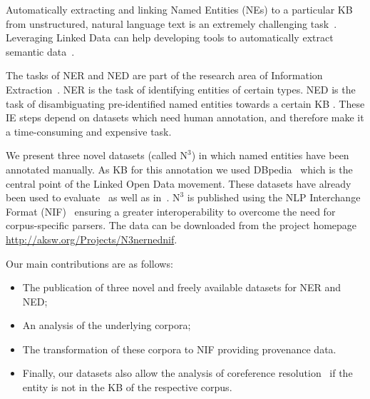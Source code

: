 

Automatically extracting and linking Named Entities (NEs) to a particular \ac{KB}  from unstructured, natural language text is an extremely challenging task~\cite{Cucerzan07}. 
Leveraging Linked Data can help developing tools to automatically extract semantic data~\cite{GER+13,AIDA,spotlight,agdistis_iswc}.

The tasks of \ac{NER}  and \ac{NED}  are part of the research area of Information Extraction~\cite{FOX}.
NER is the task of identifying entities of certain types.
NED is the task of disambiguating pre-identified named entities towards a certain \ac{KB} .
These IE steps depend on datasets which need human annotation, and therefore make it a time-consuming and expensive task.

We present three novel datasets (called $\mbox{N}^3$) in which named entities have been annotated manually. As \ac{KB}  for this annotation we used DBpedia~\cite{dbpedia-swj} which is the central point of the Linked Open Data movement. These datasets have already been used to evaluate~\cite{AIDA,spotlight} as well as in~\cite{GER+13,agdistis_iswc,GERBIL}.
$\mbox{N}^3$ is published using the \ac{NLP} Interchange Format (NIF)~\cite{ISWC2013NIF} ensuring a greater interoperability to overcome the need for corpus-specific parsers. 
The data can be downloaded from the project homepage \url{http://aksw.org/Projects/N3nernednif}.

Our main contributions are as follows:
\begin{itemize}
\item The publication of three novel and freely available datasets for \ac{NER} and \ac{NED};
\item An analysis of the underlying corpora;
\item The transformation of these corpora to NIF providing provenance data.
\item Finally, our datasets also allow the analysis of coreference resolution~\cite{NgongaNgomo2014,singh} if the entity is not in the \ac{KB}  of the respective corpus.
\end{itemize}

